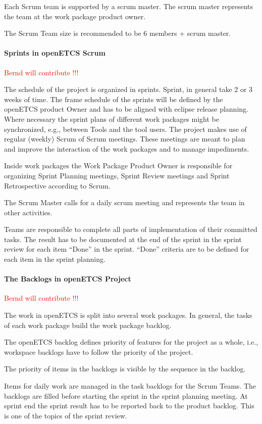 \documentclass{template/openetcs_article}
\begin{document}
Each Scrum team is supported by a scrum master. The scrum master represents the team at the work package product owner.

The Scrum Team size is recommended to be 6 members + scrum master.


\paragraph{Sprints in openETCS Scrum}
\textcolor{red}{Bernd will contribute !!!}

The schedule of the project is organized in sprints. Sprint, in general take 2 or 3 weeks of time. The frame schedule of the sprints will be defined by the openETCS product Owner and has to be aligned with eclipse release planning. Where necessary the sprint plans of different work packages might be synchronized, e.g., between Tools and the tool users. The project makes use of regular (weekly) Scrum of Scrum meetings. These meetings are meant to plan and improve the interaction of the work packages and to manage impediments.

Inside work packages the Work Package Product Owner is responsible for organizing Sprint Planning meetings, Sprint Review meetings and Sprint Retrospective according to Scrum.

The Scrum Master calls for a daily scrum meeting and represents the team in other activities.

Teams are responsible to complete all parts of implementation of their committed tasks. The result has to be documented at the end of the sprint in the sprint review for each item ``Done'' in the sprint. ``Done'' criteria are to be defined for each item in the sprint planning.

\paragraph{The Backlogs in openETCS Project}
\textcolor{red}{Bernd will contribute !!!}

The work in openETCS is split into several work packages. In general, the tasks of each work package build the work package backlog. 

The openETCS backlog defines priority of features for the project as a whole, i.e., workspace backlogs have to follow the priority of the project.

The priority of items in the backlogs is visible by the sequence in the backlog.

Items for daily work are managed in the task backlogs for the Scrum Teams. The backlogs are filled before starting the sprint in the sprint planning meeting. At sprint end the sprint result has to be reported back to the product backlog. This is one of the topics of the sprint review. 
\end{document}
